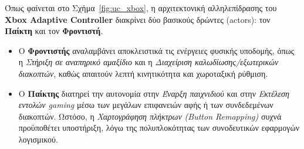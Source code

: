 \documentclass[twoside, a4paper, 11pt]{article}
\begin{document}
Όπως φαίνεται στο Σχήμα~\ref{fig:uc_xbox}, η αρχιτεκτονική αλληλεπίδρασης του \textbf{Xbox Adaptive Controller} διακρίνει δύο βασικούς δρώντες (actors): τον \textbf{Παίκτη} και τον \textbf{Φροντιστή}. 
\begin{itemize}
    \item Ο \textbf{Φροντιστής} αναλαμβάνει αποκλειστικά τις ενέργειες φυσικής υποδομής, όπως η \emph{Στήριξη σε αναπηρικό αμαξίδιο} και η \emph{Διαχείριση καλωδίωσης/εξωτερικών διακοπτών}, καθώς απαιτούν λεπτή κινητικότητα και χωροταξική ρύθμιση.
    \item Ο \textbf{Παίκτης} διατηρεί την αυτονομία στην \emph{Έναρξη παιχνιδιού} και στην \emph{Εκτέλεση εντολών gaming} μέσω των μεγάλων επιφανειών αφής ή των συνδεδεμένων διακοπτών. Ωστόσο, η \emph{Χαρτογράφηση πλήκτρων (Button Remapping)} συχνά προϋποθέτει υποστήριξη, λόγω της πολυπλοκότητας των συνοδευτικών εφαρμογών λογισμικού.
\end{itemize}
\end{document}
